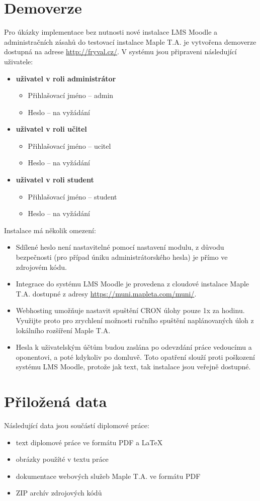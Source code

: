 \documentclass[
print,
  11pt,
  table,   
  nolof,    
  nolot,
  oneside,final
]{fithesis3}
\begin{document}
\chapter{Demoverze}
Pro úkázky implementace bez nutnosti nové instalace LMS Moodle a administračních zásahů do testovací instalace Maple T.A. je vytvořena demoverze dostupná na adrese \url{http://fryval.cz/}. V systému jsou připraveni následující uživatele:
\begin{itemize}
\item \textbf{uživatel v roli administrátor}
	\begin{itemize}
		\item Přihlašovací jméno -- admin
		\item Heslo -- na vyžádání
	\end{itemize}
\item \textbf{uživatel v roli učitel}
	\begin{itemize}
		\item Přihlašovací jméno -- ucitel
		\item Heslo -- na vyžádání
	\end{itemize}
\item \textbf{uživatel v roli student}
	\begin{itemize}
		\item Přihlašovací jméno -- student
		\item Heslo -- na vyžádání
	\end{itemize}
\end{itemize}


Instalace má několik omezení:
\begin{itemize}
	\item Sdílené heslo není nastavitelné pomocí nastavení modulu, z důvodu bezpečnosti (pro případ úniku administrátorského hesla) je přímo ve zdrojovém kódu.
	\item Integrace do systému LMS Moodle je provedena z cloudové instalace Maple T.A. dostupné z adresy \url{https://muni.mapleta.com/muni/}.

	\item Webhosting umožňuje nastavit spuštění CRON úlohy pouze 1x za hodinu. Využijte proto pro zrychlení možnosti ručního spuštění naplánovaných úloh z lokálního rozšíření Maple T.A.
	\item Hesla k uživatelským účtům budou zaslána po odevzdání práce vedoucímu a oponentovi, a poté kdykoliv po domluvě. Toto opatření slouží proti poškození systému LMS Moodle, protože jak text, tak instalace jsou veřejně dostupné.
	\end{itemize}

\chapter{Přiložená data}
Následující data jsou součástí diplomové práce:
\begin{itemize}
\item text diplomové práce ve formátu PDF a \LaTeX
\item obrázky použíté v textu práce
\item dokumentace webových služeb Maple T.A. ve formátu PDF
\item ZIP archív zdrojových kódů
\end{itemize}
\end{document}
